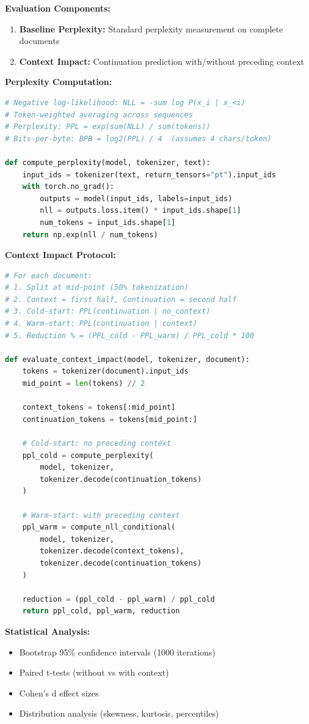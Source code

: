 \documentclass[11pt,a4paper]{article}
\begin{document}
\textbf{Evaluation Components:}
\begin{enumerate}
\item \textbf{Baseline Perplexity:} Standard perplexity measurement on complete documents
\item \textbf{Context Impact:} Continuation prediction with/without preceding context
\end{enumerate}

\textbf{Perplexity Computation:}
\begin{lstlisting}[language=Python]
# Negative log-likelihood: NLL = -sum log P(x_i | x_<i)
# Token-weighted averaging across sequences
# Perplexity: PPL = exp(sum(NLL) / sum(tokens))
# Bits-per-byte: BPB = log2(PPL) / 4  (assumes 4 chars/token)

def compute_perplexity(model, tokenizer, text):
    input_ids = tokenizer(text, return_tensors="pt").input_ids
    with torch.no_grad():
        outputs = model(input_ids, labels=input_ids)
        nll = outputs.loss.item() * input_ids.shape[1]
        num_tokens = input_ids.shape[1]
    return np.exp(nll / num_tokens)
\end{lstlisting}

\textbf{Context Impact Protocol:}
\begin{lstlisting}[language=Python]
# For each document:
# 1. Split at mid-point (50% tokenization)
# 2. Context = first half, Continuation = second half
# 3. Cold-start: PPL(continuation | no_context)
# 4. Warm-start: PPL(continuation | context)
# 5. Reduction % = (PPL_cold - PPL_warm) / PPL_cold * 100

def evaluate_context_impact(model, tokenizer, document):
    tokens = tokenizer(document).input_ids
    mid_point = len(tokens) // 2
    
    context_tokens = tokens[:mid_point]
    continuation_tokens = tokens[mid_point:]
    
    # Cold-start: no preceding context
    ppl_cold = compute_perplexity(
        model, tokenizer, 
        tokenizer.decode(continuation_tokens)
    )
    
    # Warm-start: with preceding context
    ppl_warm = compute_nll_conditional(
        model, tokenizer,
        tokenizer.decode(context_tokens),
        tokenizer.decode(continuation_tokens)
    )
    
    reduction = (ppl_cold - ppl_warm) / ppl_cold
    return ppl_cold, ppl_warm, reduction
\end{lstlisting}

\textbf{Statistical Analysis:}
\begin{itemize}
\item Bootstrap 95\% confidence intervals (1000 iterations)
\item Paired t-tests (without vs with context)
\item Cohen's d effect sizes
\item Distribution analysis (skewness, kurtosis, percentiles)
\end{itemize}
\end{document}
